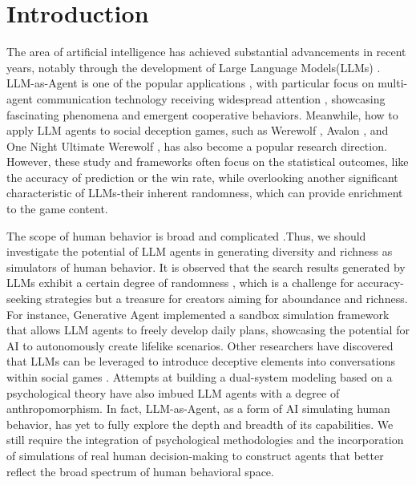 
\section{Introduction}
\label{sec:intro}

The area of artificial intelligence has achieved substantial advancements in recent years, notably through the development of Large Language Models(LLMs) \cite{achiam2023gpt,meta2022human,ouyang2022training} . LLM-as-Agent is one of the popular applications \citep{yao2022react,zhu2023ghost,zhao2024expel}, with particular focus on multi-agent communication technology receiving widespread attention \citep{qian2023communicative,li2023camel,wang2023avalon}, showcasing fascinating phenomena and emergent cooperative behaviors. Meanwhile, how to apply LLM agents to social deception games, such as Werewolf \citep{xu2023exploring,wu2024enhance}, Avalon \citep{wang2023avalon,light2023avalonbench}, and One Night Ultimate Werewolf \citep{jin2024learning}, has also become a popular research direction. However, these study and frameworks often focus on the statistical outcomes, like the accuracy of prediction or the win rate, while overlooking another significant characteristic of LLMs-their inherent randomness, which can provide enrichment to the game content.

The scope of human behavior is broad and complicated \citep{riedl2012interactive,yannakakis2012game}.Thus, we should investigate the potential of LLM agents in generating diversity and richness as simulators of human behavior. It is observed that the search results generated by LLMs exhibit a certain degree of randomness \citep{yadkori2024believe,hendrycks2020measuring}, which is a challenge for accuracy-seeking strategies but a treasure for creators aiming for aboundance and richness. For instance, Generative Agent \citep{park2023generative} implemented a sandbox simulation framework that allows LLM agents to freely develop daily plans, showcasing the potential for AI to autonomously create lifelike scenarios. Other researchers have discovered that LLMs can be leveraged to introduce deceptive elements into conversations within social games \citep{wang2023avalon}. Attempts at building a dual-system modeling based on a psychological theory \citep{wu2024enhance} have also imbued LLM agents with a degree of anthropomorphism. In fact, LLM-as-Agent, as a form of AI simulating human behavior, has yet to fully explore the depth and breadth of its capabilities. We still require the integration of psychological methodologies and the incorporation of simulations of real human decision-making to construct agents that better reflect the broad spectrum of human behavioral space.

